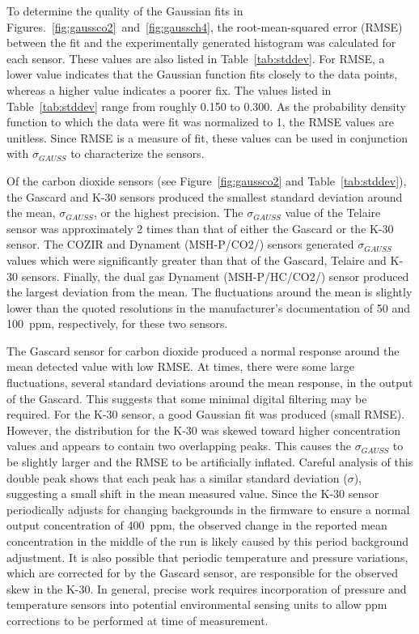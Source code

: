 \documentclass[times]{joehreview}
\begin{document}
	To determine the quality of the Gaussian fits in Figures.~\ref{fig:gaussco2}~and~\ref{fig:gaussch4}, the root-mean-squared error (RMSE)  between the fit and the experimentally generated histogram was calculated for each sensor.  These values are also listed in Table~\ref{tab:stddev}.  For RMSE, a lower value indicates that the Gaussian function fits closely to the data points, whereas a higher value indicates a poorer fix.   The values listed in Table~\ref{tab:stddev} range from roughly 0.150 to 0.300.  As the probability density function to which the data were fit was normalized to 1, the RMSE values are unitless.  Since RMSE is a measure of fit, these values can be used in conjunction with $\sigma_{GAUSS}$ to characterize the sensors.
	
	Of the carbon dioxide sensors (see Figure~\ref{fig:gaussco2} and Table~\ref{tab:stddev}), the Gascard and K-30 sensors produced the smallest standard deviation around the mean, $\sigma_{GAUSS}$, or the highest precision.  The $\sigma_{GAUSS}$ value of the Telaire sensor was approximately 2 times than that of either the Gascard or the K-30 sensor.  The COZIR and Dynament (MSH-P/CO2/) sensors generated $\sigma_{GAUSS}$ values which were significantly greater than that of the Gascard, Telaire and K-30 sensors.  Finally, the dual gas Dynament (MSH-P/HC/CO2/) sensor produced the largest deviation from the mean. The fluctuations around the mean is slightly lower than the quoted resolutions in the manufacturer's documentation of 50 and 100~ppm, respectively, for these two sensors.
	
	The Gascard sensor for carbon dioxide produced a normal response around the mean detected value with low RMSE.  At times, there were some large fluctuations, several standard deviations around the mean response, in the output of the Gascard.  This suggests that some minimal digital filtering may be required.  For the K-30 sensor, a good Gaussian fit was produced (small RMSE).  However, the distribution for the K-30 was skewed toward higher concentration values and appears to contain two overlapping peaks. This causes the $\sigma_{GAUSS}$ to be slightly larger and the RMSE to be artificially inflated.  Careful analysis of this double peak shows that each peak has a similar standard deviation ($\sigma$), suggesting a small shift in the mean measured value.  Since the K-30 sensor periodically adjusts for changing backgrounds in the firmware to ensure a normal output concentration of 400~ppm, the observed change in the reported mean concentration in the middle of the run is likely caused by this period background adjustment.  It is also possible that periodic temperature and pressure variations, which are corrected for by the Gascard sensor, are responsible for the observed skew in the K-30.  In general, precise work requires incorporation of pressure and temperature sensors into potential environmental sensing units to allow ppm corrections to be performed at time of measurement.
	
\end{document}

